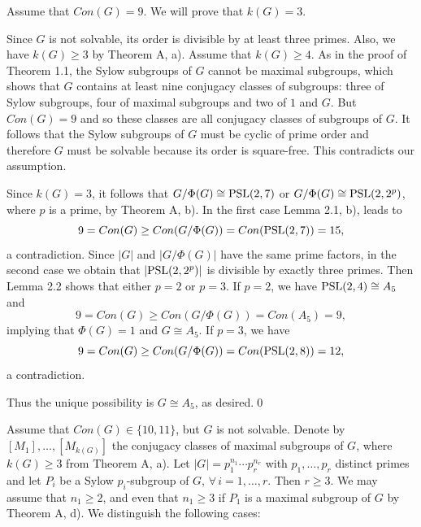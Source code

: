 \documentclass[12pt]{article}
\newcommand{\0}{{\leqno}}
\begin{document}
\bigskip{} Assume that $Con(G)=9$. We will prove that $k(G)=3$.

Since $G$ is not solvable, its order is divisible by at least three primes. Also, we have $k(G)\geq 3$ by Theorem A, a). Assume that $k(G)\geq 4$. As in the proof of Theorem 1.1, the Sylow subgroups of $G$ cannot be maximal subgroups, which shows that $G$ contains at least nine conjugacy classes of subgroups: three of Sylow subgroups, four of maximal subgroups and two of $1$ and $G$. But $Con(G)=9$ and so these classes are all conjugacy classes of subgroups of $G$. It follows that the Sylow subgroups of $G$ must be cyclic of prime order and therefore $G$ must be solvable because its order is square-free. This contradicts our assumption.

Since $k(G)=3$, it follows that $G/\Phi(G)\cong {\rm PSL}(2,7)$ or $G/\Phi(G)\cong {\rm PSL}(2,2^p)$, where $p$ is a prime, by Theorem A, b). In the first case Lemma 2.1, b), leads to
\begin{equation}
9=Con(G)\geq Con(G/\Phi(G))=Con({\rm PSL}(2,7))=15,\nonumber
\end{equation}a contradiction. Since $|G|$ and $|G/\Phi(G)|$ have the same prime factors, in the second case we obtain that $|{\rm PSL}(2,2^p)|$ is divisible by exactly three primes. Then Lemma 2.2 shows that either $p=2$ or $p=3$. If $p=2$, we have ${\rm PSL}(2,4)\cong A_5$ and
\begin{equation}
9=Con(G)\geq Con(G/\Phi(G))=Con(A_5)=9,\nonumber
\end{equation}implying that $\Phi(G)=1$ and $G\cong A_5$. If $p=3$, we have
\begin{equation}
9=Con(G)\geq Con(G/\Phi(G))=Con({\rm PSL}(2,8))=12,\nonumber
\end{equation}a contradiction. 

Thus the unique possibility is $G\cong A_5$, as desired.\qed

\bigskip{} Assume that $Con(G)\in\{10, 11\}$, but $G$ is not solvable. Denote by $[M_1], \dots, [M_{k(G)}]$ the conjugacy classes of maximal subgroups of $G$, where $k(G)\geq 3$ from Theorem A, a). Let $|G|=p_1^{n_1}\cdots p_r^{n_r}$ with $p_1, \dots, p_r$ distinct primes and let $P_i$ be a Sylow $p_i$-subgroup of $G$, $\forall\, i=1, \dots, r$. Then $r\geq 3$. We may assume that $n_1\geq 2$, and even that $n_1\geq 3$ if $P_1$ is a maximal subgroup of $G$ by Theorem A, d). We distinguish the following cases:

\medskip
\end{document}
